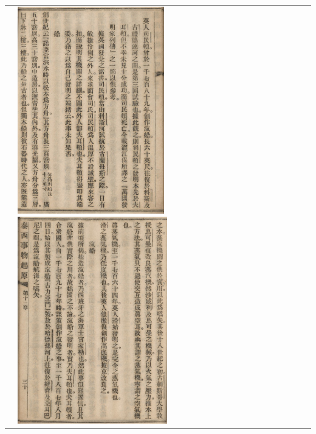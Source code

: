 \documentclass[fontsize=11pt, paper=a4, 
DIV15,
headings=normal,
parskip=half-, 
numbers=noenddot]{scrartcl}
\begin{document}
\begin{tabular}{@{}ll}
\parbox[b]{29.5mm}{
 \\[80mm]
} & 
\includegraphics[height=9cm]{text14p74_neu} \quad
\includegraphics[height=9cm]{text14p73}
\end{tabular}
\end{document}
